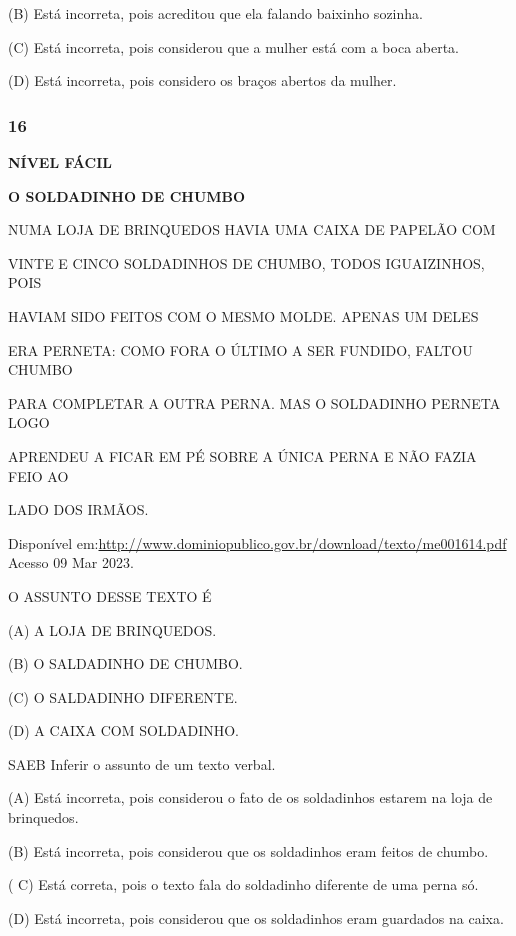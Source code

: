 (B) Está incorreta, pois acreditou que ela falando baixinho sozinha.

(C) Está incorreta, pois considerou que a mulher está com a boca aberta.

(D) Está incorreta, pois considero os braços abertos da mulher.

\subsubsection{16}\label{section-109}

\textbf{NÍVEL FÁCIL}

\textbf{O SOLDADINHO DE CHUMBO}

NUMA LOJA DE BRINQUEDOS HAVIA UMA CAIXA DE PAPELÃO COM

VINTE E CINCO SOLDADINHOS DE CHUMBO, TODOS IGUAIZINHOS, POIS

HAVIAM SIDO FEITOS COM O MESMO MOLDE. APENAS UM DELES

ERA PERNETA: COMO FORA O ÚLTIMO A SER FUNDIDO, FALTOU CHUMBO

PARA COMPLETAR A OUTRA PERNA. MAS O SOLDADINHO PERNETA LOGO

APRENDEU A FICAR EM PÉ SOBRE A ÚNICA PERNA E NÃO FAZIA FEIO AO

LADO DOS IRMÃOS.

Disponível
em:\url{http://www.dominiopublico.gov.br/download/texto/me001614.pdf}
Acesso 09 Mar 2023.

O ASSUNTO DESSE TEXTO É

(A) A LOJA DE BRINQUEDOS.

(B) O SALDADINHO DE CHUMBO.

(C) O SALDADINHO DIFERENTE.

(D) A CAIXA COM SOLDADINHO.

SAEB Inferir o assunto de um texto verbal.

(A) Está incorreta, pois considerou o fato de os soldadinhos estarem na
loja de brinquedos.

(B) Está incorreta, pois considerou que os soldadinhos eram feitos de
chumbo.

( C) Está correta, pois o texto fala do soldadinho diferente de uma
perna só.

(D) Está incorreta, pois considerou que os soldadinhos eram guardados na
caixa.

\section{}\label{section-110}

